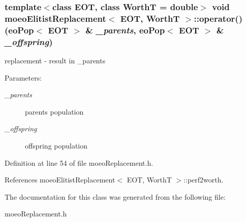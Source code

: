 \subsubsection{\setlength{\rightskip}{0pt plus 5cm}template$<$class EOT, class Worth\-T = double$>$ void {\bf moeo\-Elitist\-Replacement}$<$ EOT, Worth\-T $>$::operator() (eo\-Pop$<$ EOT $>$ \& {\em \_\-parents}, eo\-Pop$<$ EOT $>$ \& {\em \_\-offspring})\hspace{0.3cm}{\tt  [inline]}}\label{classmoeoElitistReplacement_aad627deb45859e65ace0709c004049a}


replacement - result in \_\-parents 

\begin{Desc}
\item[Parameters:]
\begin{description}
\item[{\em \_\-parents}]parents population \item[{\em \_\-offspring}]offspring population \end{description}
\end{Desc}


Definition at line 54 of file moeo\-Replacement.h.

References moeo\-Elitist\-Replacement$<$ EOT, Worth\-T $>$::perf2worth.

The documentation for this class was generated from the following file:\begin{CompactItemize}
\item 
moeo\-Replacement.h\end{CompactItemize}

